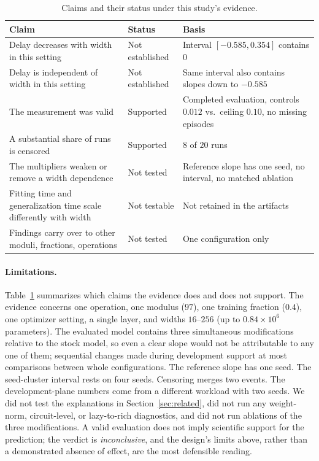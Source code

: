 \documentclass{article}
\begin{document}
\begin{table}[t]
\centering
\caption{Claims and their status under this study's evidence.}
\label{tab:claims}
\small
\begin{tabular}{p{}p{}p{}}
\toprule
Claim & Status & Basis \\
\midrule
Delay decreases with width in this setting & Not established & Interval $[-0.585,0.354]$ contains $0$ \\
Delay is independent of width in this setting & Not established & Same interval also contains slopes down to $-0.585$ \\
The measurement was valid & Supported & Completed evaluation, controls $0.012$ vs.\ ceiling $0.10$, no missing episodes \\
A substantial share of runs is censored & Supported & $8$ of $20$ runs \\
The multipliers weaken or remove a width dependence & Not tested & Reference slope has one seed, no interval, no matched ablation \\
Fitting time and generalization time scale differently with width & Not testable & Not retained in the artifacts \\
Findings carry over to other moduli, fractions, operations & Not tested & One configuration only \\
\bottomrule
\end{tabular}
\end{table}

\paragraph{Limitations.} Table~\ref{tab:claims} summarizes which claims the evidence does and does not support. The evidence concerns one operation, one modulus ($97$), one training fraction ($0.4$), one optimizer setting, a single layer, and widths $16$--$256$ (up to $0.84\times 10^6$ parameters). The evaluated model contains three simultaneous modifications relative to the stock model, so even a clear slope would not be attributable to any one of them; sequential changes made during development support at most comparisons between whole configurations. The reference slope has one seed. The seed-cluster interval rests on four seeds. Censoring merges two events. The development-plane numbers come from a different workload with two seeds. We did not test the explanations in Section~\ref{sec:related}, did not run any weight-norm, circuit-level, or lazy-to-rich diagnostics, and did not run ablations of the three modifications. A valid evaluation does not imply scientific support for the prediction; the verdict is \emph{inconclusive}, and the design's limits above, rather than a demonstrated absence of effect, are the most defensible reading.
\end{document}
